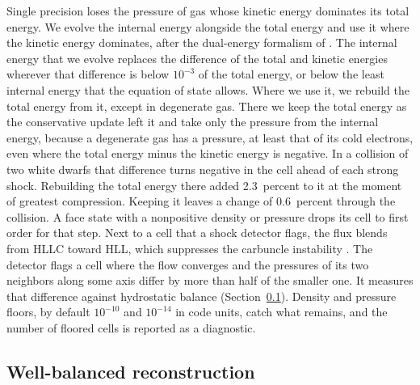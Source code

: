 \documentclass[twocolumn]{aastex701}
\begin{document}
Single precision loses the pressure of gas whose kinetic energy dominates its total energy. We evolve the internal energy alongside the total energy and use it where the kinetic energy dominates, after the dual-energy formalism of \citet{Bryan1995}. The internal energy that we evolve replaces the difference of the total and kinetic energies wherever that difference is below $10^{-3}$ of the total energy, or below the least internal energy that the equation of state allows. Where we use it, we rebuild the total energy from it, except in degenerate gas. There we keep the total energy as the conservative update left it and take only the pressure from the internal energy, because a degenerate gas has a pressure, at least that of its cold electrons, even where the total energy minus the kinetic energy is negative. In a collision of two white dwarfs that difference turns negative in the cell ahead of each strong shock. Rebuilding the total energy there added 2.3~percent to it at the moment of greatest compression. Keeping it leaves a change of 0.6~percent through the collision. A face state with a nonpositive density or pressure drops its cell to first order for that step. Next to a cell that a shock detector flags, the flux blends from HLLC toward HLL, which suppresses the carbuncle instability \citep{Quirk1994}. The detector flags a cell where the flow converges and the pressures of its two neighbors along some axis differ by more than half of the smaller one. It measures that difference against hydrostatic balance (Section~\ref{sec:wellbalanced}). Density and pressure floors, by default $10^{-10}$ and $10^{-14}$ in code units, catch what remains, and the number of floored cells is reported as a diagnostic.

\subsection{Well-balanced reconstruction}
\label{sec:wellbalanced}
\end{document}
